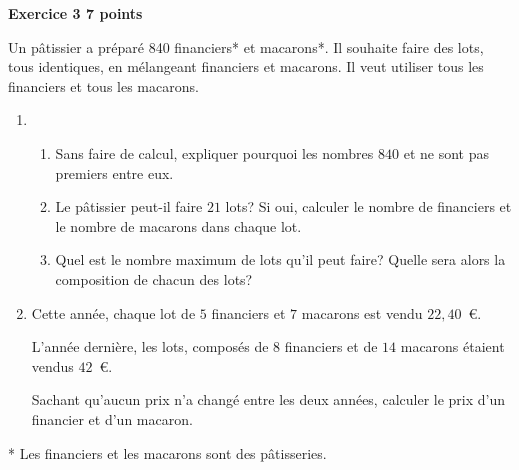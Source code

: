 \textbf{Exercice 3 \hfill 7 points}

\medskip 

Un pâtissier a préparé 840 financiers* et  macarons*. Il souhaite faire des lots, tous identiques, en mélangeant financiers et macarons. Il veut utiliser tous les financiers et tous les macarons. 

\medskip

\begin{enumerate}
\item 
	\begin{enumerate}
		\item Sans faire de calcul, expliquer pourquoi les nombres $840$ et  ne sont pas premiers entre eux. 
		\item Le pâtissier peut-il faire $21$ lots? Si oui, calculer le nombre de financiers et le nombre de macarons dans chaque lot. 
		\item Quel est le nombre maximum de lots qu'il peut faire? Quelle sera alors la composition de chacun des lots? 
	\end{enumerate}
\item Cette année, chaque lot de $5$ financiers et $7$ macarons est vendu $22,40$~\euro. 

L'année dernière, les lots, composés de $8$ financiers et de $14$ macarons étaient vendus $42$~\euro. 

Sachant qu'aucun prix n'a changé entre les deux années, calculer le prix d'un financier et d'un macaron. 
\medskip
\end{enumerate}
* Les financiers et les macarons sont des pâtisseries. 


\bigskip

